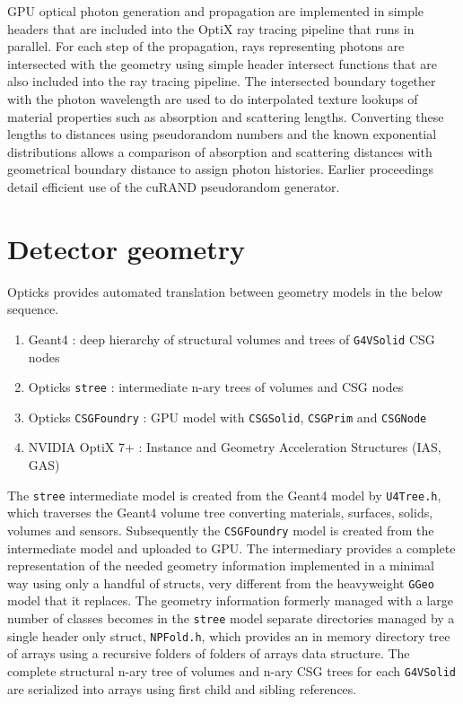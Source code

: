 \documentclass{webofc}
\begin{document}
GPU optical photon generation and propagation are implemented in simple headers that are included
into the OptiX ray tracing pipeline that runs in parallel. 
For each step of the propagation, rays representing photons are intersected
with the geometry using simple header intersect functions that are also included into the ray tracing pipeline.
The intersected boundary together with the photon wavelength are used to do interpolated texture lookups of
material properties such as absorption and scattering lengths.
Converting these lengths to distances using pseudorandom numbers and 
the known exponential distributions allows a comparison of absorption and scattering distances 
with geometrical boundary distance to assign photon histories. 
Earlier proceedings\cite{chep2016} detail efficient use of the cuRAND\cite{curandURL} pseudorandom generator.
%
\section{Detector geometry} 
\label{secgeom}%
Opticks provides automated translation between geometry models in the below sequence. 
%
\begin{enumerate}
\item Geant4 : deep hierarchy of structural volumes and trees of {\tt G4VSolid} CSG nodes
\item Opticks {\tt stree} : intermediate n-ary trees of volumes and CSG nodes
\item Opticks {\tt CSGFoundry} : GPU model with {\tt CSGSolid}, {\tt CSGPrim} and {\tt CSGNode} 
\item NVIDIA OptiX 7+ : Instance and Geometry Acceleration Structures (IAS, GAS)
\end{enumerate}  
%
The {\tt stree} intermediate model is created from the Geant4 model by {\tt U4Tree.h},
which traverses the Geant4 volume tree converting materials, surfaces, solids, volumes and sensors.
Subsequently the {\tt CSGFoundry} model is created from the intermediate model and uploaded to GPU.   
The intermediary provides a complete representation of the needed geometry information
implemented in a minimal way using only a handful of structs, very different from the heavyweight {\tt GGeo} 
model that it replaces. 
The geometry information formerly managed with a large number of classes becomes 
in the {\tt stree} model separate directories managed by a single header only struct, {\tt NPFold.h}, 
which provides an in memory directory tree of arrays using a recursive folders of folders of arrays data structure.
The complete structural n-ary tree of volumes and n-ary CSG trees for each {\tt G4VSolid} 
are serialized into arrays using first child and sibling references.
\end{document}
